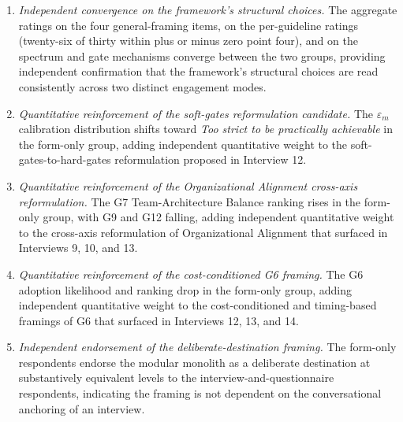 \begin{enumerate}[itemsep=4pt,topsep=2pt]
  \item \emph{Independent convergence on the framework's structural choices.} The aggregate ratings on the four general-framing items, on the per-guideline ratings (twenty-six of thirty within plus or minus zero point four), and on the spectrum and gate mechanisms converge between the two groups, providing independent confirmation that the framework's structural choices are read consistently across two distinct engagement modes.
  \item \emph{Quantitative reinforcement of the soft-gates reformulation candidate.} The $\varepsilon_m$ calibration distribution shifts toward \emph{Too strict to be practically achievable} in the form-only group, adding independent quantitative weight to the soft-gates-to-hard-gates reformulation proposed in Interview 12.
  \item \emph{Quantitative reinforcement of the Organizational Alignment cross-axis reformulation.} The G7 Team-Architecture Balance ranking rises in the form-only group, with G9 and G12 falling, adding independent quantitative weight to the cross-axis reformulation of Organizational Alignment that surfaced in Interviews 9, 10, and 13.
  \item \emph{Quantitative reinforcement of the cost-conditioned G6 framing.} The G6 adoption likelihood and ranking drop in the form-only group, adding independent quantitative weight to the cost-conditioned and timing-based framings of G6 that surfaced in Interviews 12, 13, and 14.
  \item \emph{Independent endorsement of the deliberate-destination framing.} The form-only respondents endorse the modular monolith as a deliberate destination at substantively equivalent levels to the interview-and-questionnaire respondents, indicating the framing is not dependent on the conversational anchoring of an interview.
\end{enumerate}
